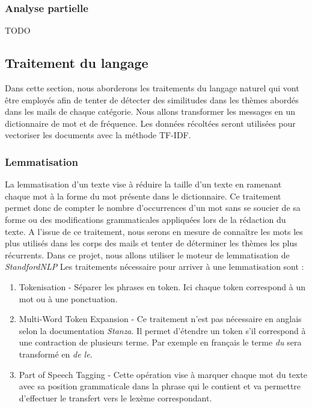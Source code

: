     \subsubsection*{Analyse partielle}
    TODO

\subsection{Traitement du langage}
    Dans cette section, nous aborderons les traitements du langage naturel qui vont être employés afin de tenter de
    détecter des similitudes dans les thèmes abordés dans les mails de chaque catégorie.
    Nous allons transformer les messages en un dictionnaire de mot et de fréquence.
    Les données récoltées seront utilisées pour vectoriser les documents avec la méthode TF-IDF\@.

    \subsubsection{Lemmatisation}
        La lemmatisation d'un texte vise à réduire la taille d'un texte en ramenant chaque mot à la forme du mot présente dans le dictionnaire.
        Ce traitement permet donc de compter le nombre d'occurrences d'un mot sans se soucier de sa forme ou des modifications grammaticales appliquées lors de la rédaction du texte.
        A l'issue de ce traitement, nous serons en mesure de connaître les mots les plus utilisés dans les corps des mails et tenter de déterminer les thèmes les plus récurrents.
        Dans ce projet, nous allons utiliser le moteur de lemmatisation de \emph{StandfordNLP}\cite{manning-EtAl:2014:P14-5}\cite{qi2020stanza}
        Les traitements nécessaire pour arriver à une lemmatisation sont :
        \begin{enumerate}
            \item Tokenisation - Séparer les phrases en token. Ici chaque token correspond à un mot ou à une ponctuation.
            \item Multi-Word Token Expansion - Ce traitement n'est pas nécessaire en anglais selon la documentation \emph{Stanza}. Il permet d'étendre un token s'il correspond à une contraction de plusieurs terme. Par exemple en français le terme \emph{du} sera transformé en \emph{de le}.
            \item Part of Speech Tagging - Cette opération vise à marquer chaque mot du texte avec sa position grammaticale dans la phrase qui le contient et va permettre d'effectuer le transfert vers le lexème correspondant.
        \end{enumerate}

